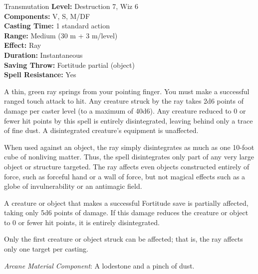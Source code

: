 {Transmutation}
{
	\textbf{Level:}
	Destruction 7, Wiz 6\\
	\textbf{Components:}
	V, S, M/DF\\
	\textbf{Casting Time:}
	1 standard action\\
	\textbf{Range:}
	Medium (30 m + 3 m/level)\\
	\textbf{Effect:}
	Ray\\
	\textbf{Duration:}
	Instantaneous\\
	\textbf{Saving Throw:}
	Fortitude partial (object)\\
	\textbf{Spell Resistance:}
	Yes\\
}
{
	A thin, green ray springs from your pointing finger. You must make a successful ranged touch attack to hit. Any creature struck by the ray takes 2d6 points of damage per caster level (to a maximum of 40d6). Any creature reduced to 0 or fewer hit points by this spell is entirely disintegrated, leaving behind only a trace of fine dust. A disintegrated creature's equipment is unaffected.

	When used against an object, the ray simply disintegrates as much as one 10-foot cube of nonliving matter. Thus, the spell disintegrates only part of any very large object or structure targeted. The ray affects even objects constructed entirely of force, such as forceful hand or a wall of force, but not magical effects such as a globe of invulnerability or an antimagic field.

	A creature or object that makes a successful Fortitude save is partially affected, taking only 5d6 points of damage. If this damage reduces the creature or object to 0 or fewer hit points, it is entirely disintegrated.

	Only the first creature or object struck can be affected; that is, the ray affects only one target per casting.

	\textit{Arcane Material Component}:
	A lodestone and a pinch of dust.

}
